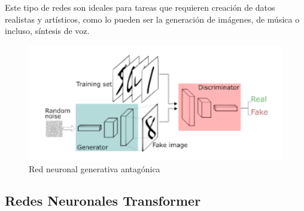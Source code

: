 Este tipo de redes son ideales para tareas que requieren creación de datos realistas y artísticos, como lo pueden ser la generación de imágenes, de música o incluso, síntesis de voz. 

\begin{figure}[h]
	\centering
	\includegraphics[width = 1 \textwidth]{Imagenes/Vectorial/gan.png}
	\caption{Red neuronal generativa antagónica \citep{gan}}
	\label{fig:gan}
\end{figure}


\subsection{Redes Neuronales Transformer}

